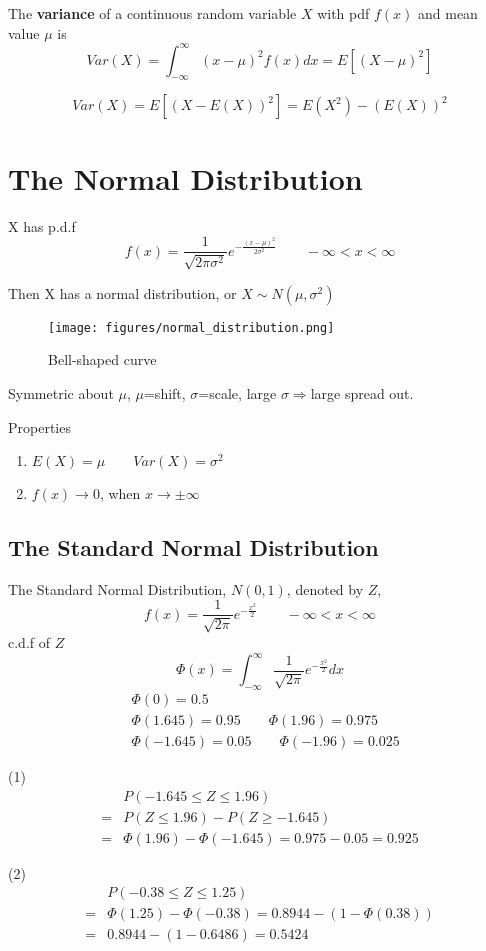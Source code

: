 \begin{defn}
The \textbf{variance} of a continuous random variable $X$ with pdf $f(x)$ and mean value $\mu$ is
\[Var(X)=\int_{-\infty}^{\infty} (x-\mu)^2f(x)dx=E[(X-\mu)^2]\]
\end{defn}

\begin{prop}
\[Var(X)=E[(X-E(X))^2]=E(X^2)-(E(X))^2\]
\end{prop}

\section{The Normal Distribution}
X has p.d.f 
\[f(x)=\frac{1}{\sqrt{2 \pi \sigma^2}} e^{-\frac{(x-\mu)^2}{2 \sigma^2}}   \qquad -\infty< x< \infty \]

Then X has a normal distribution, or $X \sim N(\mu,\sigma^2)$

\begin{figure}[H]
\centering
\texttt{[image: figures/normal\_distribution.png]}
\caption{Bell-shaped curve}
\end{figure}

Symmetric about $\mu$, $\mu$=shift, $\sigma$=scale, large $\sigma\Rightarrow$large spread out.
 
\begin{prop}
Properties
\begin{enumerate}
\item $E(X)=\mu \qquad	Var(X)=\sigma^2$
\item $f(x) \to 0$, when $x \to \pm \infty$
\end{enumerate}
\end{prop}

\subsection{The Standard Normal Distribution}
The Standard Normal Distribution, $N(0,1)$, denoted by $Z$,
\[f(x)=\frac{1}{\sqrt{2 \pi}} e^{-\frac{x^2}{2}}  \qquad -\infty< x< \infty\]
c.d.f of $Z$
\[\Phi(x)=\int_{-\infty}^{\infty} \frac{1}{\sqrt{2 \pi}} e^{-\frac{x^2}{2}}  dx\]
\begin{align*}
&\Phi(0)=0.5 \\
&\Phi(1.645)=0.95 \qquad \Phi(1.96)=0.975 \\
&\Phi(-1.645)=0.05 \qquad \Phi(-1.96)=0.025
\end{align*}

\begin{exmp}
(1)
\begin{align*}
&P(-1.645 \leq Z \leq 1.96)\\
=&P(Z \leq 1.96)-P(Z \geq -1.645) \\
=&\Phi(1.96)-\Phi(-1.645)=0.975-0.05=0.925
\end{align*}

(2)
\begin{align*}
&P(-0.38 \leq Z \leq 1.25)\\
=&\Phi(1.25)-\Phi(-0.38)=0.8944-(1-\Phi(0.38))\\
=&0.8944-(1-0.6486)=0.5424
\end{align*}
\end{exmp}

